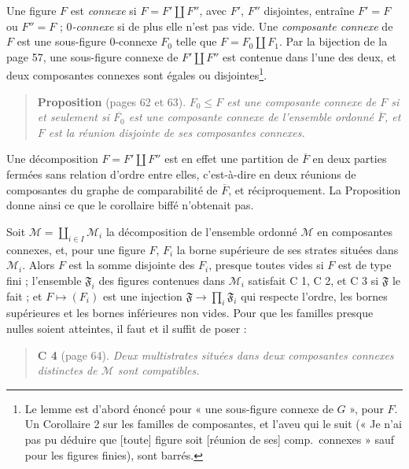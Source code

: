 \documentclass[11pt,a4paper]{article}
\begin{document}
Une figure $F$ est \emph{connexe} si $F = F' \amalg F''$, avec $F'$, $F''$
disjointes, entraîne $F' = F$ ou $F'' = F$ ; \emph{$0$-connexe} si de plus elle
n'est pas vide. Une \emph{composante connexe} de $F$ est une sous-figure
$0$-connexe $F_{0}$ telle que $F = F_{0} \amalg F_{1}$. Par la bijection de la
page 57, une sous-figure connexe de $F' \amalg F''$ est contenue dans l'une
des deux, et deux composantes connexes sont égales ou disjointes\footnote{Le
lemme est d'abord énoncé pour « une sous-figure connexe de $G$ », pour $F$. Un
Corollaire 2 sur les familles de composantes, et l'aveu qui le suit (« Je
n'ai pas pu déduire que [toute] figure soit [réunion de ses] comp.\
connexes » sauf pour les figures finies), sont barrés.}.

\begin{quote}
\textbf{Proposition} (pages 62 et 63). \emph{$F_{0} \leq F$ est une composante
connexe de $F$ si et seulement si $\overline{F_{0}}$ est une composante
connexe de l'ensemble ordonné $\overline{F}$, et $F$ est la réunion disjointe
de ses composantes connexes.}
\end{quote}

Une décomposition $F = F' \amalg F''$ est en effet une partition de
$\overline{F}$ en deux parties fermées sans relation d'ordre entre elles,
c'est-à-dire en deux réunions de composantes du graphe de comparabilité de
$\overline{F}$, et réciproquement. La Proposition donne ainsi ce que le
corollaire biffé n'obtenait pas.

Soit $\mathcal{M} = \coprod_{i \in I} \mathcal{M}_{i}$ la décomposition de
l'ensemble ordonné $\mathcal{M}$ en composantes connexes, et, pour une figure
$F$, $F_{i}$ la borne supérieure de ses strates situées dans
$\mathcal{M}_{i}$. Alors $F$ est la somme disjointe des $F_{i}$, presque toutes
vides si $F$ est de type fini ; l'ensemble $\mathfrak{F}_{i}$ des figures
contenues dans $\mathcal{M}_{i}$ satisfait C 1, C 2, et C 3 si $\mathfrak{F}$
le fait ; et $F \mapsto (F_{i})$ est une injection $\mathfrak{F} \to \prod_{i}
\mathfrak{F}_{i}$ qui respecte l'ordre, les bornes supérieures et les bornes
inférieures non vides. Pour que les familles presque nulles soient atteintes, il
faut et il suffit de poser :

\begin{quote}
\textbf{C 4} (page 64). \emph{Deux multistrates situées dans deux composantes
connexes distinctes de $\mathcal{M}$ sont compatibles.}
\end{quote}
\end{document}
